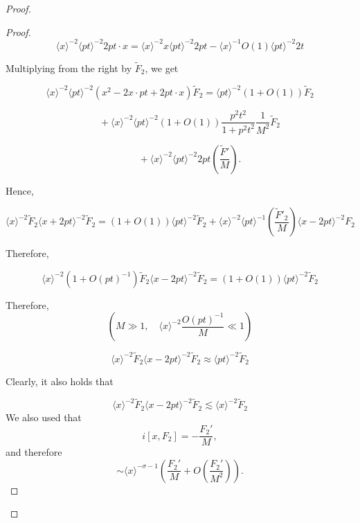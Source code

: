 \documentclass[11pt]{article}
\begin{document}
\begin{proof}
\begin{proof}
\[
\langle x\rangle^{-2}
\langle pt\rangle^{-2}
2pt\!\cdot\!x=
\langle x\rangle^{-2}x
\langle pt\rangle^{-2}2pt
-\langle x\rangle^{-1}O(1)\langle pt\rangle^{-2}2t
\]

Multiplying from the right by $\widetilde F_2$, we get

\begin{equation}
\langle x\rangle^{-2}\langle pt\rangle^{-2}(x^2-2x\!\cdot\!pt+2pt\!\cdot\!x)\widetilde F_2=
\langle pt\rangle^{-2}(1+O(1))\widetilde F_2
\end{equation}

\[
\qquad+\langle x\rangle^{-2}\langle pt\rangle^{-2}(1+O(1))
\frac{p^2t^2}{1+p^2t^2}\frac{1}{M^2}\widetilde F_2
\]

\[
\qquad+\langle x\rangle^{-2}\langle pt\rangle^{-2}2pt\left(\frac{\widetilde F'}{M}\right).
\]

Hence,

\begin{equation}
\langle x\rangle^{-2}
\widetilde F_2
\langle x+2pt\rangle^{-2}
\widetilde F_2
=
(1+O(1))
\langle pt\rangle^{-2}
\widetilde F_2
+\langle x\rangle^{-2}\langle pt\rangle^{-1}\left(\frac{\widetilde F'_2}{M}\right)\langle x-2pt\rangle^{-2}F_2
\end{equation}

Therefore,

\begin{equation}
\langle x\rangle^{-2}(1+O(pt)^{-1})\widetilde F_2\langle x-2pt\rangle^{-2}\widetilde F_2=(1+O(1))\langle pt\rangle^{-2}\widetilde F_2
\end{equation}

Therefore,
\[\left(M\gg1,\quad\langle x\rangle^{-2}\frac{O(pt)^{-1}}{M}\ll1\right)
\]

\begin{equation}
\langle x\rangle^{-2}\widetilde F_2\langle x-2pt\rangle^{-2}\widetilde F_2\approx\langle pt\rangle^{-2}\widetilde F_2
\end{equation}

Clearly, it also holds that

\begin{equation}
\langle x\rangle^{-2}\widetilde F_2\langle x-2pt\rangle^{-2}\widetilde F_2\lesssim\langle x\rangle^{-2}\widetilde F_2
\end{equation}
We also used that
\[
i[x,F_2]=-\frac{F_2'}{M},
\]
and therefore
\begin{equation}
[\langle x\rangle^{-\sigma},F_2]
\sim\langle x\rangle^{-\sigma-1}\left (\frac{F_2'}{M}+O\!\left(\frac{F_2'}{M^2}\right)\right).
\end{equation}


\end{proof}
\end{proof}
\end{document}
